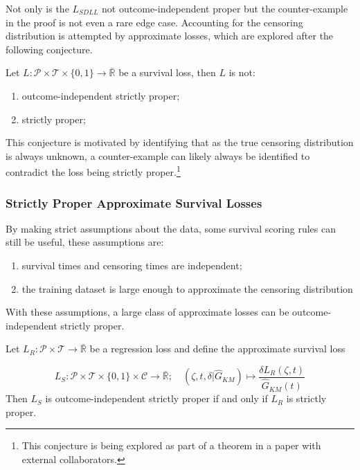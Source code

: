 \documentclass[
  letterpaper,
]{scrbook}
\providecommand{\tightlist}{%
  \setlength{\itemsep}{0pt}\setlength{\parskip}{0pt}}\usepackage{longtable,booktabs,array}
\theoremstyle{plain}
\theoremstyle{definition}
\theoremstyle{remark}
\begin{document}
Not only is the \(L_{SDLL}\) not outcome-independent proper but the
counter-example in the proof is not even a rare edge case. Accounting
for the censoring distribution is attempted by approximate losses, which
are explored after the following conjecture.

\leavevmode{}%
\label{conj:no_proper_loss} Let
\(L: \mathcal{P}\times \mathcal{T}\times \{0,1\}\rightarrow \bar{\mathbb{R}}\)
be a survival loss, then \(L\) is not:

\begin{enumerate}
\def\labelenumi{\roman{enumi}.}
\tightlist
\item
  outcome-independent strictly proper;
\item
  strictly proper;
\end{enumerate}

This conjecture is motivated by identifying that as the true censoring
distribution is always unknown, a counter-example can likely always be
identified to contradict the loss being strictly proper.\footnote{This
  conjecture is being explored as part of a theorem in a paper with
  external collaborators.}

\hypertarget{sec-eval-distr-score-proper-strict}{%
\subsubsection{Strictly Proper Approximate Survival
Losses}\label{sec-eval-distr-score-proper-strict}}

By making strict assumptions about the data, some survival scoring rules
can still be useful, these assumptions are:

\begin{enumerate}
\def\labelenumi{\roman{enumi}.}
\tightlist
\item
  survival times and censoring times are independent;
\item
  the training dataset is large enough to approximate the censoring
  distribution
\end{enumerate}

With these assumptions, a large class of approximate losses can be
outcome-independent strictly proper.

\leavevmode{}%
\label{thm:surv_regr_proper} Let
\(L_R: \mathcal{P}\times \mathcal{T}\rightarrow \bar{\mathbb{R}}\) be a
regression loss and define the approximate survival loss

\[
L_S: \mathcal{P}\times \mathcal{T}\times \{0,1\}\times \mathcal{C}\rightarrow \bar{\mathbb{R}}; \quad
(\zeta, t, \delta|\hat{G}_{KM}) \mapsto \frac{\delta L_R(\zeta, t)}{\hat{G}_{KM}(t)}
\] Then \(L_S\) is outcome-independent strictly proper if and only if
\(L_R\) is strictly proper.
\end{document}
